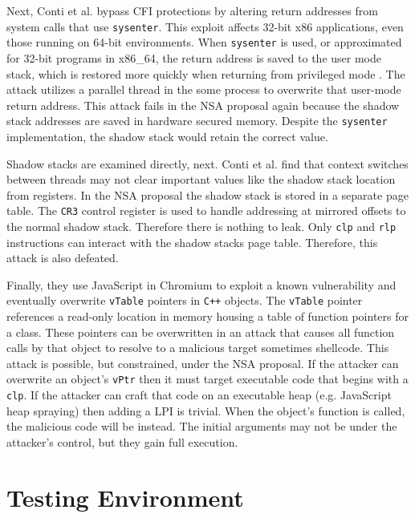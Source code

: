 \documentclass[conference,compsoc]{IEEEtran}
\begin{document}
Next, Conti et al. bypass CFI protections by altering return addresses from system calls that use \texttt{sysenter}. This exploit affects 32-bit x86 applications, even those running on 64-bit environments. When \texttt{sysenter} is used, or approximated for 32-bit programs in x86\_64, the return address is saved to the user mode stack, which is restored more quickly when returning from privileged mode \cite{conti}. The attack utilizes a parallel thread in the some process to overwrite that user-mode return address. This attack fails in the NSA proposal again because the shadow stack addresses are saved in hardware secured memory. Despite the \texttt{sysenter} implementation, the shadow stack would retain the correct value.

Shadow stacks are examined directly, next. Conti et al. find that context switches between threads may not clear important values like the shadow stack location from registers. In the NSA proposal the shadow stack is stored in a separate page table. The \texttt{CR3} control register is used to handle addressing at mirrored offsets to the normal shadow stack. Therefore there is nothing to leak. Only \texttt{clp} and \texttt{rlp} instructions can interact with the shadow stacks page table. Therefore, this attack is also defeated.

Finally, they use JavaScript in Chromium to exploit a known vulnerability and eventually overwrite \texttt{vTable} pointers in \texttt{C++} objects. The \texttt{vTable} pointer references a read-only location in memory housing a table of function pointers for a class. These pointers can be overwritten in an attack that causes all function calls by that object to resolve to a malicious target sometimes shellcode\cite{smashingvptrs}. This attack is possible, but constrained, under the NSA proposal. If the attacker can overwrite an object's \texttt{vPtr} then it must target executable code that begins with a \texttt{clp}. If the attacker can craft that code on an executable heap (e.g. JavaScript heap spraying) then adding a LPI is trivial. When the object's function is called, the malicious code will be instead. The initial arguments may not be under the attacker's control, but they gain full execution.


\section{Testing Environment} \label{sec:environment}
\end{document}
